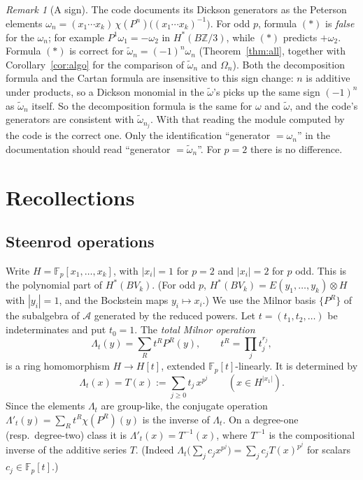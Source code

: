 \documentclass[11pt]{amsart}
\theoremstyle{definition}
\theoremstyle{remark}
\newtheorem{remark}[theorem]{Remark}
\newcommand{\F}{\mathbb{F}_p}
\newcommand{\A}{\mathcal{A}}
\newcommand{\wt}{\widetilde{\omega}}
\begin{document}
\begin{remark}[A sign]\label{rem:sign}
The code documents its Dickson generators as the Peterson elements
$\omega_n=(x_1\cdots x_k)\,\chi(P^n)\bigl((x_1\cdots x_k)^{-1}\bigr)$.  For odd
$p$, formula $(\ast)$ is \emph{false} for the $\omega_n$; for example
$P^1\omega_1=-\omega_2$ in $H^*(B\mathbb{Z}/3)$, while $(\ast)$ predicts
$+\omega_2$.  Formula $(\ast)$ is correct for
$\wt_n=(-1)^n\omega_n$ (Theorem~\ref{thm:all}, together with
Corollary~\ref{cor:algo} for the comparison of $\wt_n$ and $\Omega_n$).  Both the decomposition formula and the Cartan formula
are insensitive to this sign change: $n$ is additive under products, so a
Dickson monomial in the $\wt$'s picks up the same sign $(-1)^n$ as $\wt_n$
itself.  So the decomposition formula is the same for $\omega$ and $\wt$, and
the code's generators are consistent with $\wt_{n_j}$.  With that reading the
module computed by the code is the correct one.  Only the identification
``generator $=\omega_n$'' in the documentation should read
``generator $=\wt_n$''.  For $p=2$ there is no difference.
\end{remark}

\section{Recollections}\label{sec:recollections}

\subsection{Steenrod operations}
Write $H=\F[x_1,\dots,x_k]$, with $|x_i|=1$ for $p=2$ and $|x_i|=2$ for $p$
odd.  This is the polynomial part of $H^*(BV_k)$.  (For odd $p$,
$H^*(BV_k)=E(y_1,\dots,y_k)\otimes H$ with $|y_i|=1$, and the Bockstein maps
$y_i\mapsto x_i$.)  We use the Milnor basis $\{P^R\}$ of the subalgebra of
$\A$ generated by the reduced powers.  Let $t=(t_1,t_2,\dots)$ be indeterminates
and put $t_0=1$.  The \emph{total Milnor operation}
\[
  \Lambda_t(y)=\sum_R t^R P^R(y),\qquad t^R=\prod_j t_j^{r_j},
\]
is a ring homomorphism $H\to H[t]$, extended $\F[t]$-linearly.  It is
determined by
\[
  \Lambda_t(x)=T(x):=\sum_{j\ge0} t_j\,x^{p^j}\qquad(x\in H^{|x_1|}).
\]
Since the elements $\Lambda_t$ are group-like, the conjugate operation
$\Lambda'_t(y)=\sum_R t^R\chi(P^R)(y)$ is the inverse of $\Lambda_t$.  On a
degree-one (resp.\ degree-two) class it is $\Lambda'_t(x)=T^{-1}(x)$, where
$T^{-1}$ is the compositional inverse of the additive series $T$.
(Indeed $\Lambda_t\bigl(\sum_j c_jx^{p^j}\bigr)=\sum_j c_j T(x)^{p^j}$ for
scalars $c_j\in\F[t]$.)
\end{document}
